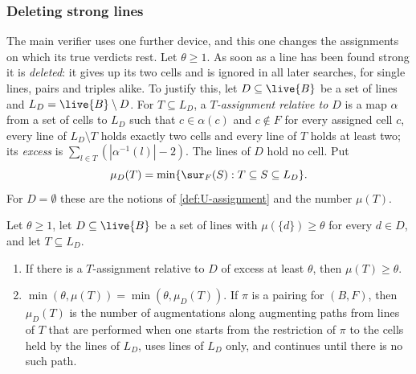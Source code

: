 \subsubsection*{Deleting strong lines}
The main verifier uses one further device, and this one changes the assignments on which its true
verdicts rest. Let $\theta\ge1$. As soon as a line has been found strong it is \emph{deleted}: it gives
up its two cells and is ignored in all later searches, for single lines, pairs and triples alike. To
justify this, let $D\subseteq\live{B}$ be a set of lines and $L_D=\live{B}\setminus D$. For
$T\subseteq L_D$, a \emph{$T$-assignment relative to $D$} is a map $\alpha$ from a set of cells to $L_D$
such that $c\in\alpha(c)$ and $c\notin F$ for every assigned cell $c$, every line of $L_D\setminus T$
holds exactly two cells and every line of $T$ holds at least two; its \emph{excess} is
$\sum_{l\in T}(|\alpha^{-1}(l)|-2)$. The lines of $D$ hold no cell. Put
\[
  \mu_D(T)=\min\{\sur_F(S) : T\subseteq S\subseteq L_D\}.
\]
For $D=\emptyset$ these are the notions of \cref{def:U-assignment} and the number $\mu(T)$.

\begin{lemma}\label{lem:deleted}
Let $\theta\ge 1$, let $D\subseteq\live{B}$ be a set of lines with $\mu(\{d\})\ge\theta$ for every
$d\in D$, and let $T\subseteq L_D$.
\begin{enumerate}[label=\textup{(\alph*)}]
\item If there is a $T$-assignment relative to $D$ of excess at least $\theta$, then $\mu(T)\ge\theta$.
\item $\min(\theta,\mu(T))=\min(\theta,\mu_D(T))$. If $\pi$ is a pairing for $(B,F)$, then $\mu_D(T)$ is
      the number of augmentations along augmenting paths from lines of $T$ that are performed when one
      starts from the restriction of $\pi$ to the cells held by the lines of $L_D$, uses lines of $L_D$
      only, and continues until there is no such path.
\end{enumerate}
\end{lemma}

